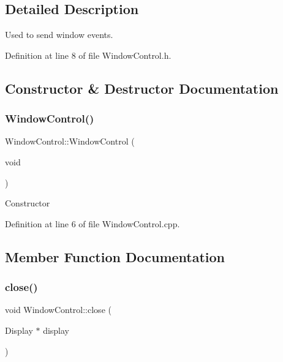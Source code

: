 \subsection{Detailed Description}
Used to send window events. 

Definition at line 8 of file Window\+Control.\+h.



\subsection{Constructor \& Destructor Documentation}
\mbox{\label{class_ubuntu_controller_1_1_window_control_ac1737a56defaa8f60f53054b2167fee8}} 
\subsubsection{\texorpdfstring{Window\+Control()}{WindowControl()}}
{\footnotesize\ttfamily Window\+Control\+::\+Window\+Control (\begin{DoxyParamCaption}\item[{void}]{ }\end{DoxyParamCaption})}

Constructor 

Definition at line 6 of file Window\+Control.\+cpp.



\subsection{Member Function Documentation}
\mbox{\label{class_ubuntu_controller_1_1_window_control_a2f521062be8be113d1cbcca4f495d693}} 
\subsubsection{\texorpdfstring{close()}{close()}}
{\footnotesize\ttfamily void Window\+Control\+::close (\begin{DoxyParamCaption}\item[{Display $\ast$}]{display }\end{DoxyParamCaption})}

